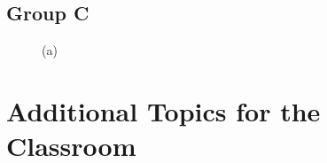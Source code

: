 \subsection{Group C}

\begin{figure}[H]
	\centering
	\begin{minipage}[b]{0.3\linewidth}
	\end{minipage}\hfill
	\begin{minipage}[b]{0.3\linewidth}
	\end{minipage}\hfill	
	\begin{minipage}[b]{0.3\linewidth}
	\end{minipage}\hfill
	\begin{minipage}[b]{0.3\linewidth}
	\end{minipage}\hfill
	\begin{minipage}[b]{0.3\linewidth}
	\end{minipage}\hfill	
	\begin{minipage}[b]{0.3\linewidth}
	\end{minipage}\hfill
	\begin{minipage}[b]{0.3\linewidth}
	\end{minipage}\hfill
	\begin{minipage}[b]{0.3\linewidth}
	\end{minipage}\hfill	
	\begin{minipage}[b]{0.3\linewidth}
	\end{minipage}\hfill
	\caption{(a)}
	\label{fig:Figure1}
\end{figure} 


\section{Additional Topics for the Classroom}

\begin{enumerate}
\end{enumerate}



